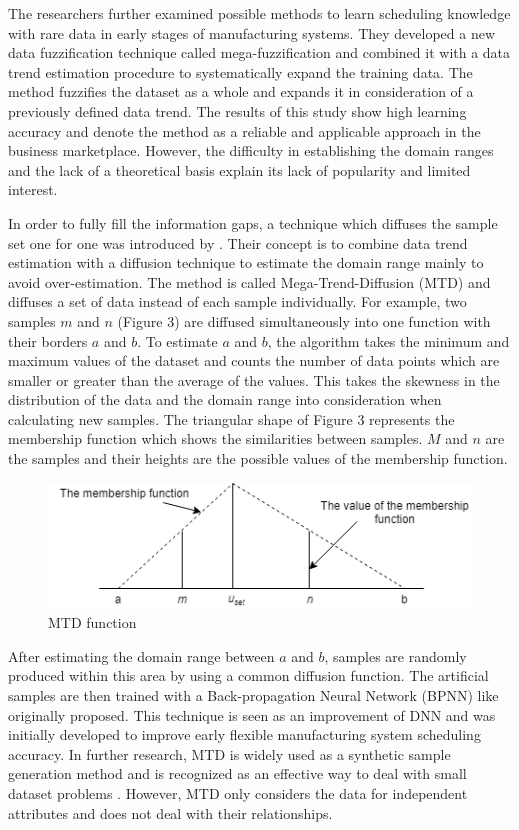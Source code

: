 \documentclass[parskip=full]{scrartcl}
\begin{document}
The researchers \cite{Li.2006b} further examined possible methods to learn scheduling knowledge with 
rare data in early stages of manufacturing systems. They developed a new data fuzzification technique 
called mega-fuzzification and combined it with a data trend estimation procedure to systematically 
expand the training data. The method fuzzifies the dataset as a whole and expands it in consideration of 
a previously defined data trend. The results of this study show high learning accuracy and denote the 
method as a reliable and applicable approach in the business marketplace. However, the difficulty in 
establishing the domain ranges and the lack of a theoretical basis explain its lack of popularity and 
limited interest. 

In order to fully fill the information gaps, a technique which diffuses the sample set one for one was 
introduced by \cite{Li.2007}. Their concept is to combine data trend estimation with a diffusion 
technique to estimate the domain range mainly to avoid over-estimation. The method is called 
Mega-Trend-Diffusion (MTD) and diffuses a set of data instead of each sample individually. For 
example, two samples $\mathit{m}$ and $\mathit{n}$ (Figure 3) are diffused simultaneously into one 
function with their borders $\mathit{a}$ and $\mathit{b}$. To estimate $\mathit{a}$ and $\mathit{b}$, 
the algorithm takes the minimum and maximum values of the dataset and counts the number of data 
points which are smaller or greater than the average of the values. This takes the skewness in the 
distribution of the data and the domain range into consideration when calculating new samples. The 
triangular shape of Figure 3 represents the membership function which shows the similarities between 
samples. $\mathit{M}$ and $\mathit{n}$ are the samples and their heights are 
the possible values of the membership function.

\begin{figure}[H]
	\centering
	\includegraphics[width=0.6\linewidth]{"./resources/mtd_function"}
	\caption{MTD function \cite{Li.2007}}
	\label{fig:mtd-function}
\end{figure}

After estimating the domain range between $\mathit{a}$ and $\mathit{b}$, samples are randomly 
produced within this area by using a common diffusion function. The artificial samples are then trained 
with a Back-propagation Neural Network (BPNN) like \cite{Huang.2004} originally proposed. This 
technique is seen as an improvement of DNN and was initially developed to improve early flexible 
manufacturing system scheduling accuracy. In further research, MTD is widely used as a synthetic 
sample generation method and is recognized as an effective way to deal with small dataset problems 
\cite{AbdulLateh.2017}. However, MTD only considers the data for independent attributes and does not 
deal with their relationships. 
\end{document}
